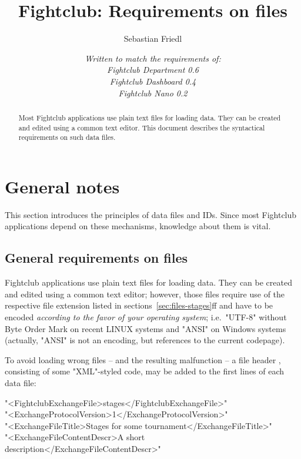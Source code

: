 \documentclass[11pt]{ltxdoc}
\title{\bfseries Fightclub: Requirements on files}
\author{Sebastian Friedl}
\date{\itshape Written to match the requirements of: \\
      Fightclub Department 0.6 \\
      Fightclub Dashboard 0.4 \\
      Fightclub Nano 0.2}
\def\highlight#1{%
    \colorbox{red!15}{#1}%
    \index{\textsf{#1}}}
\begin{document}
    \maketitle
    
    \begin{abstract}\noindent
        Most Fightclub applications use plain text files for loading data. They can be created and edited using a common text editor. This document describes the syntactical requirements on such data files.
    \end{abstract}

    \tableofcontents

    
    
    
    
    \clearpage
    \section{General notes}
    This section introduces the principles of data files and IDs.
    Since most Fightclub applications depend on these mechanisms, knowledge about them is vital.
    
    \subsection{General requirements on files}
    Fightclub applications use plain text files for loading data. They can be created and edited using a common text editor; however, those files require use of the respective file extension listed in sections~\ref{sec:files-stages}ff and have to be encoded \textit{according to the favor of your operating system}; i.e.~"UTF-8" without Byte Order Mark on recent LINUX systems and "ANSI" on Windows systems (actually, "ANSI" is not an encoding, but references to the current codepage).

    \medskip
    To avoid loading wrong files -- and the resulting malfunction -- a \highlight{file header}, consisting of some "XML"-styled code, may be added to the first lines of each data file:
    
    \smallskip
    "<FightclubExchangeFile>stages</FightclubExchangeFile>" \\
    "<ExchangeProtocolVersion>1</ExchangeProtocolVersion>" \\
    "<ExchangeFileTitle>Stages for some tournament</ExchangeFileTitle>" \\
    "<ExchangeFileContentDescr>A short description</ExchangeFileContentDescr>"
    
\end{document}
